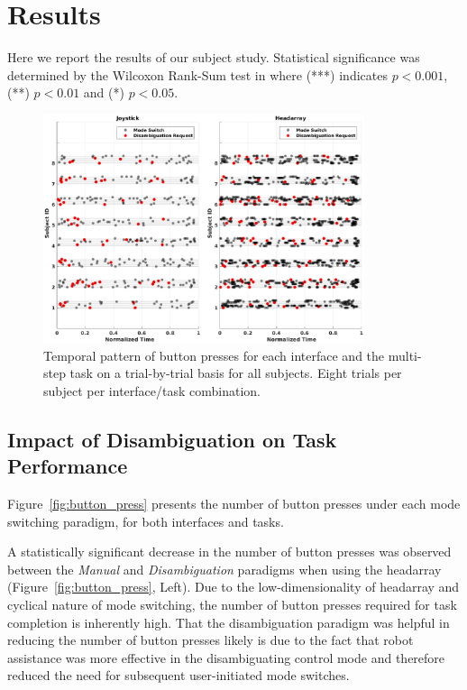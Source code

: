 \documentclass[natbib, twocolumn]{svjour3}          %
\begin{document}
\section{Results}\label{sec:results}


Here we report the results of our subject study. Statistical significance was determined by the Wilcoxon Rank-Sum test in where (***) indicates $p < 0.001$, (**) $p < 0.01$ and (*) $p < 0.05$. 
\begin{figure}[ht!]
	\centering
	\includegraphics[width = 0.84\textwidth,center]{Fig8.eps}
	\caption{Temporal pattern of button presses for each interface and the multi-step task on a trial-by-trial basis for all subjects. Eight trials per subject per interface/task combination.}
	\label{fig:ha_man_disamb}
\end{figure}
\subsection{Impact of Disambiguation on Task Performance}
Figure~\ref{fig:button_press} presents the number of button presses under each mode switching paradigm, for both interfaces and tasks. 

A statistically significant decrease in the number of button presses was observed between the \textit{Manual} and \textit{Disambiguation} paradigms when using the headarray (Figure~\ref{fig:button_press}, Left). Due to the low-dimensionality of headarray and cyclical nature of mode switching, the number of button presses required for task completion is inherently high. That the disambiguation paradigm was helpful in reducing the number of button presses likely is due to the fact that robot assistance was more effective in the disambiguating control mode and therefore reduced the need for subsequent user-initiated mode switches. 
\end{document}
